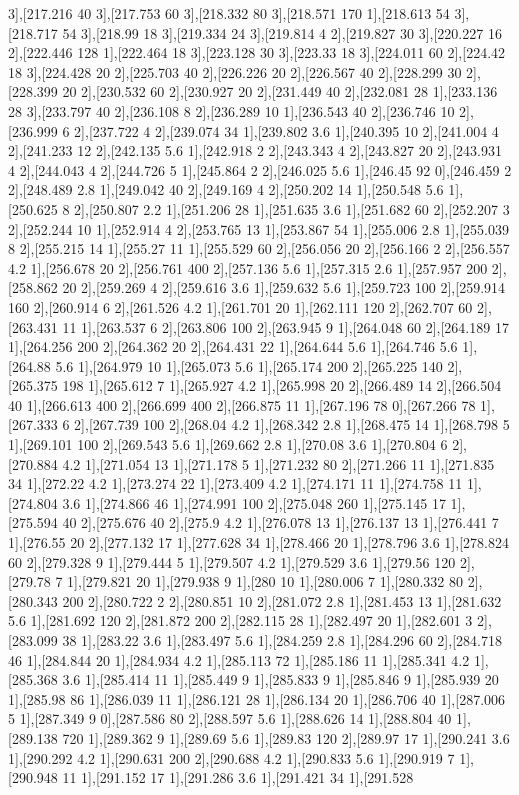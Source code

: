 {3],[217.216 40 3],[217.753 60 3],[218.332 80 3],[218.571 170 1],[218.613 54 3],[218.717 54 3],[218.99 18 3],[219.334 24 3],[219.814 4 2],[219.827 30 3],[220.227 16 2],[222.446 128 1],[222.464 18 3],[223.128 30 3],[223.33 18 3],[224.011 60 2],[224.42 18 3],[224.428 20 2],[225.703 40 2],[226.226 20 2],[226.567 40 2],[228.299 30 2],[228.399 20 2],[230.532 60 2],[230.927 20 2],[231.449 40 2],[232.081 28 1],[233.136 28 3],[233.797 40 2],[236.108 8 2],[236.289 10 1],[236.543 40 2],[236.746 10 2],[236.999 6 2],[237.722 4 2],[239.074 34 1],[239.802 3.6 1],[240.395 10 2],[241.004 4 2],[241.233 12 2],[242.135 5.6 1],[242.918 2 2],[243.343 4 2],[243.827 20 2],[243.931 4 2],[244.043 4 2],[244.726 5 1],[245.864 2 2],[246.025 5.6 1],[246.45 92 0],[246.459 2 2],[248.489 2.8 1],[249.042 40 2],[249.169 4 2],[250.202 14 1],[250.548 5.6 1],[250.625 8 2],[250.807 2.2 1],[251.206 28 1],[251.635 3.6 1],[251.682 60 2],[252.207 3 2],[252.244 10 1],[252.914 4 2],[253.765 13 1],[253.867 54 1],[255.006 2.8 1],[255.039 8 2],[255.215 14 1],[255.27 11 1],[255.529 60 2],[256.056 20 2],[256.166 2 2],[256.557 4.2 1],[256.678 20 2],[256.761 400 2],[257.136 5.6 1],[257.315 2.6 1],[257.957 200 2],[258.862 20 2],[259.269 4 2],[259.616 3.6 1],[259.632 5.6 1],[259.723 100 2],[259.914 160 2],[260.914 6 2],[261.526 4.2 1],[261.701 20 1],[262.111 120 2],[262.707 60 2],[263.431 11 1],[263.537 6 2],[263.806 100 2],[263.945 9 1],[264.048 60 2],[264.189 17 1],[264.256 200 2],[264.362 20 2],[264.431 22 1],[264.644 5.6 1],[264.746 5.6 1],[264.88 5.6 1],[264.979 10 1],[265.073 5.6 1],[265.174 200 2],[265.225 140 2],[265.375 198 1],[265.612 7 1],[265.927 4.2 1],[265.998 20 2],[266.489 14 2],[266.504 40 1],[266.613 400 2],[266.699 400 2],[266.875 11 1],[267.196 78 0],[267.266 78 1],[267.333 6 2],[267.739 100 2],[268.04 4.2 1],[268.342 2.8 1],[268.475 14 1],[268.798 5 1],[269.101 100 2],[269.543 5.6 1],[269.662 2.8 1],[270.08 3.6 1],[270.804 6 2],[270.884 4.2 1],[271.054 13 1],[271.178 5 1],[271.232 80 2],[271.266 11 1],[271.835 34 1],[272.22 4.2 1],[273.274 22 1],[273.409 4.2 1],[274.171 11 1],[274.758 11 1],[274.804 3.6 1],[274.866 46 1],[274.991 100 2],[275.048 260 1],[275.145 17 1],[275.594 40 2],[275.676 40 2],[275.9 4.2 1],[276.078 13 1],[276.137 13 1],[276.441 7 1],[276.55 20 2],[277.132 17 1],[277.628 34 1],[278.466 20 1],[278.796 3.6 1],[278.824 60 2],[279.328 9 1],[279.444 5 1],[279.507 4.2 1],[279.529 3.6 1],[279.56 120 2],[279.78 7 1],[279.821 20 1],[279.938 9 1],[280 10 1],[280.006 7 1],[280.332 80 2],[280.343 200 2],[280.722 2 2],[280.851 10 2],[281.072 2.8 1],[281.453 13 1],[281.632 5.6 1],[281.692 120 2],[281.872 200 2],[282.115 28 1],[282.497 20 1],[282.601 3 2],[283.099 38 1],[283.22 3.6 1],[283.497 5.6 1],[284.259 2.8 1],[284.296 60 2],[284.718 46 1],[284.844 20 1],[284.934 4.2 1],[285.113 72 1],[285.186 11 1],[285.341 4.2 1],[285.368 3.6 1],[285.414 11 1],[285.449 9 1],[285.833 9 1],[285.846 9 1],[285.939 20 1],[285.98 86 1],[286.039 11 1],[286.121 28 1],[286.134 20 1],[286.706 40 1],[287.006 5 1],[287.349 9 0],[287.586 80 2],[288.597 5.6 1],[288.626 14 1],[288.804 40 1],[289.138 720 1],[289.362 9 1],[289.69 5.6 1],[289.83 120 2],[289.97 17 1],[290.241 3.6 1],[290.292 4.2 1],[290.631 200 2],[290.688 4.2 1],[290.833 5.6 1],[290.919 7 1],[290.948 11 1],[291.152 17 1],[291.286 3.6 1],[291.421 34 1],[291.528 }

